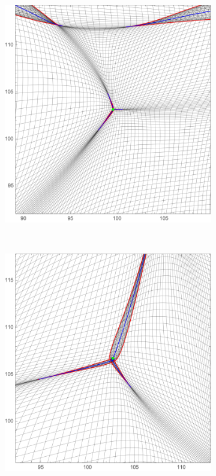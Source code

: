\documentclass[a4paper, 11pt]{article}
\begin{document}
\begin{figure}
\begin{subfigure}[b]{0.24\textwidth}
\end{subfigure}~
\begin{subfigure}[b]{0.24\textwidth}
\includegraphics[width=\textwidth]{Elliptic_Z_Zoom}
\end{subfigure}~
\begin{subfigure}[b]{0.24\textwidth}
\includegraphics[width=\textwidth]{Hyperbolic_Z_Zoom}

\end{subfigure}
\end{figure}
\end{document}
